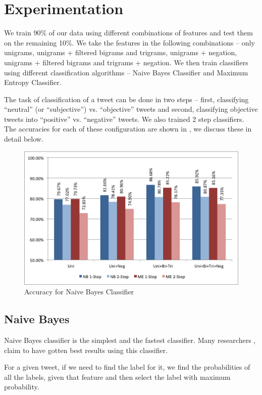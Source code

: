 \section{Experimentation} We train 90\% of our data using different combinations
of features and test them on the remaining 10\%. We take the features in the
following combinations -- only unigrams, unigrams + filtered bigrams and
trigrams, unigrams + negation, unigrams + filtered bigrams and trigrams +
negation. We then train classifiers using different classification
algorithms -- Naive Bayes Classifier and Maximum Entropy Classifier.

The task of classification of a tweet can be done in two steps -- first,
classifying ``neutral'' (or ``subjective'') vs. ``objective'' tweets and second,
classifying objective tweets into ``positive'' vs. ``negative'' tweets. We also
trained 2 step classifiers. The accuracies for each of these configuration are 
shown in , we discuss these in detail below.

\begin{figure}[h!]
\centering
\includegraphics[width=\textwidth]{img/NBME_Accuracy.png}
\caption{Accuracy for Naive Bayes Classifier}
\label{fig:nbme_acc}
\end{figure}


\subsection{Naive Bayes} Naive Bayes classifier is the simplest and the fastest
classifier. Many researchers \cite{GBH}, \cite{PP} claim to have gotten best
results using this classifier.

For a given tweet, if we need to find the label for it, we find the
probabilities of all the labels, given that feature and then select the label
with maximum probability.

